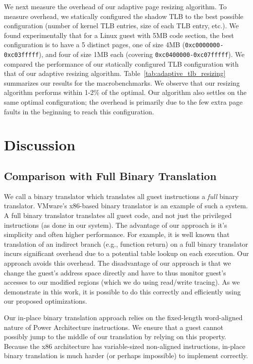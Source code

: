 \documentclass[10pt,twocolumn]{article}
\begin{document}
We next measure the overhead of our adaptive page resizing algorithm. To
measure overhead, we statically configured the shadow TLB to the best
possible configuration (number of kernel TLB entries, size of each TLB
entry, etc.). We found experimentally that for a Linux guest with 5MB code
section, the best configuration is to have a 5 distinct pages, one of size
4MB ({\tt 0xc0000000-0xc03fffff}), and
four of size 1MB each (covering {\tt 0xc0400000-0xc07fffff}). We compared the
performance of
our statically configured TLB configuration with that of our adaptive resizing
algorithm.
Table~\ref{tab:adaptive_tlb_resizing} summarizes our results for the macrobenchmarks.
We observe that our resizing algorithm performs within 1-2\% of the optimal.
Our algorithm also settles on the same optimal configuration; the overhead is
primarily due to the few extra page faults in the beginning to reach this configuration.

\section{Discussion}
\subsection{Comparison with Full Binary Translation}
\label{sec:comparison_with_vmware}
We call a binary translator which translates all guest instructions a {\em full}
binary translator.
VMware's x86-based binary translator\cite{agesen:comparison} is an example of
such a system. A full binary translator translates all guest code, and not
just the privileged instructions (as done in our system). The advantage of
our approach is it's simplicity and often higher performance.
For example, it is well known that translation of an indirect branch (e.g., function
return)
on a full binary translator incurs significant overhead due to a potential
table lookup on each execution. Our approach avoids this overhead.
The disadvantage of our approach is that we change the guest's address space
directly and have to thus monitor guest's accesses to our modified regions
(which we do using read/write tracing). As we demonstrate in this work, it is
possible to do this correctly and efficiently using our proposed optimizations.

Our in-place binary translation approach relies on the fixed-length word-aligned
nature of Power Architecture instructions. We ensure that a guest cannot possibly
jump to the middle of our translation by relying on this property. Because the
x86 architecture has variable-sized non-aligned instructions, in-place binary
translation is much harder (or perhaps impossible) to implement correctly.
\end{document}
